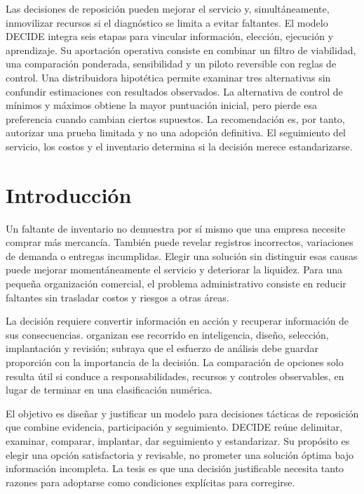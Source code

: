 \documentclass[12pt,spanish,letterpaper,oneside]{article}
\begin{document}
\insertcoverwatermark
\insertcoverinstitutionalfooter
\templatePortrait
\templatePagecfg
\onehalfspacing
\justifying

\begin{abstractd}
Las decisiones de reposición pueden mejorar el servicio y, simultáneamente,
inmovilizar recursos si el diagnóstico se limita a evitar faltantes. El modelo
DECIDE integra seis etapas para vincular información, elección, ejecución y
aprendizaje. Su aportación operativa consiste en combinar un filtro de viabilidad,
una comparación ponderada, sensibilidad y un piloto reversible con reglas de
control. Una distribuidora hipotética permite examinar tres alternativas sin
confundir estimaciones con resultados observados. La alternativa de control de
mínimos y máximos obtiene la mayor puntuación inicial, pero pierde esa preferencia
cuando cambian ciertos supuestos. La recomendación es, por tanto, autorizar una
prueba limitada y no una adopción definitiva. El seguimiento del servicio, los
costos y el inventario determina si la decisión merece estandarizarse.
\end{abstractd}
\templateIndex
\templateFinalcfg
\onehalfspacing
\justifying

\section{Introducción}
Un faltante de inventario no demuestra por sí mismo que una empresa necesite
comprar más mercancía. También puede revelar registros incorrectos, variaciones
de demanda o entregas incumplidas. Elegir una solución sin distinguir esas causas
puede mejorar momentáneamente el servicio y deteriorar la liquidez. Para una
pequeña organización comercial, el problema administrativo consiste en reducir
faltantes sin trasladar costos y riesgos a otras áreas.

La decisión requiere convertir información en acción y recuperar información de
sus consecuencias. \citet{canos} organizan ese recorrido en inteligencia, diseño,
selección, implantación y revisión; \citet{solano2003} subraya que el esfuerzo de
análisis debe guardar proporción con la importancia de la decisión. La comparación
de opciones solo resulta útil si conduce a responsabilidades, recursos y controles
observables, en lugar de terminar en una clasificación numérica.

El objetivo es diseñar y justificar un modelo para decisiones tácticas de
reposición que combine evidencia, participación y seguimiento. DECIDE reúne
delimitar, examinar, comparar, implantar, dar seguimiento y estandarizar. Su
propósito es elegir una opción satisfactoria y revisable, no prometer una solución
óptima bajo información incompleta. La tesis es que una decisión justificable
necesita tanto razones para adoptarse como condiciones explícitas para corregirse.
\end{document}
